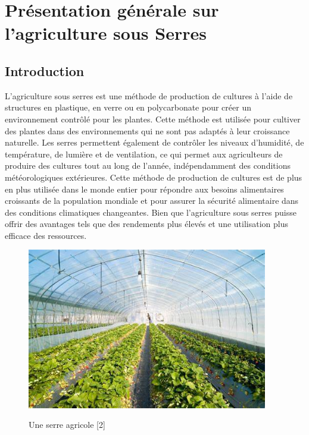 \chapter{Présentation générale sur l’agriculture sous Serres} \label{chap:Présentation générale sur l’agriculture sous Serres}

\section{Introduction}
L'agriculture sous serres est une méthode de production de cultures à l'aide de structures en plastique, en verre ou en polycarbonate pour créer un environnement contrôlé pour les plantes. Cette méthode est utilisée pour cultiver des plantes dans des environnements qui ne sont pas adaptés à leur croissance naturelle.
Les serres permettent également de contrôler les niveaux d'humidité, de température, de lumière et de ventilation, ce qui permet aux agriculteurs de produire des cultures tout au long de l'année, indépendamment des conditions météorologiques extérieures. Cette méthode de production de cultures est de plus en plus utilisée dans le monde entier pour répondre aux besoins alimentaires croissants de la population mondiale et pour assurer la sécurité alimentaire dans des conditions climatiques changeantes.
Bien que l'agriculture sous serres puisse offrir des avantages tels que des rendements plus élevés et une utilisation plus efficace des ressources.
\begin{figure}[!h]
\centering
    \label{fig:Une serre agricole} 
    
	{\includegraphics[width=10.5cm]{figures/serre.jpeg}	}
	\caption{Une serre agricole [2]}
	
\end{figure}
\pagebreak

